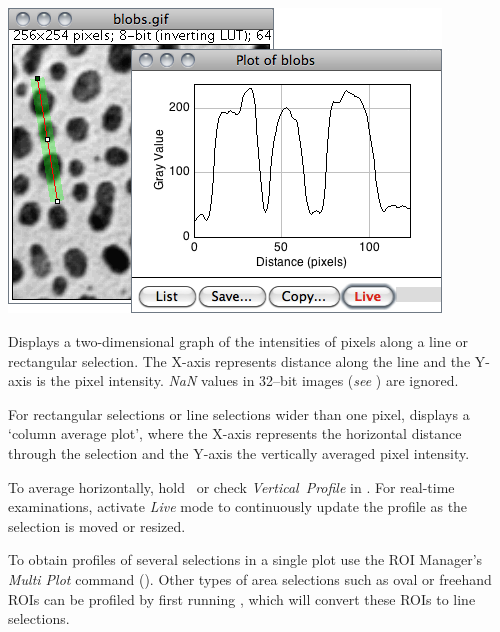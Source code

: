 \subsection[{\protect\userinterface{Plot Profile {[}k{]}}}]{\protect{}\label{sub:Plot-Profile-[k]}}

\begin{minipage}[c][1\totalheight][t]{0.591\columnwidth}%
\includegraphics[scale=0.55]{images/PlotProfile}%
\end{minipage}%
\begin{minipage}[c][1\totalheight][t]{0.409\columnwidth}%
Displays a two-dimensional graph of the intensities
of pixels along a line or rectangular selection. The X-axis represents
distance along the line and the Y-axis is the pixel intensity. \emph{NaN}
values in 32--bit images (\emph{see} ) are
ignored.

\medskip{}
For rectangular selections or line selections wider than one pixel,
displays a `column average plot', where the X-axis represents the
horizontal distance through the selection and the Y-axis the vertically
averaged pixel intensity.%
\end{minipage}

To average horizontally, hold \,
or check \emph{Vertical}\ \emph{Profile }in .
For real-time examinations, activate \emph{Live} mode to continuously
update the profile as the selection is moved or resized.

To obtain profiles of several selections in a single plot use the
ROI Manager's \emph{Multi Plot }command ().
Other types of area selections such as oval or freehand ROIs can be
profiled by first running ,
which will convert these ROIs to line selections.

